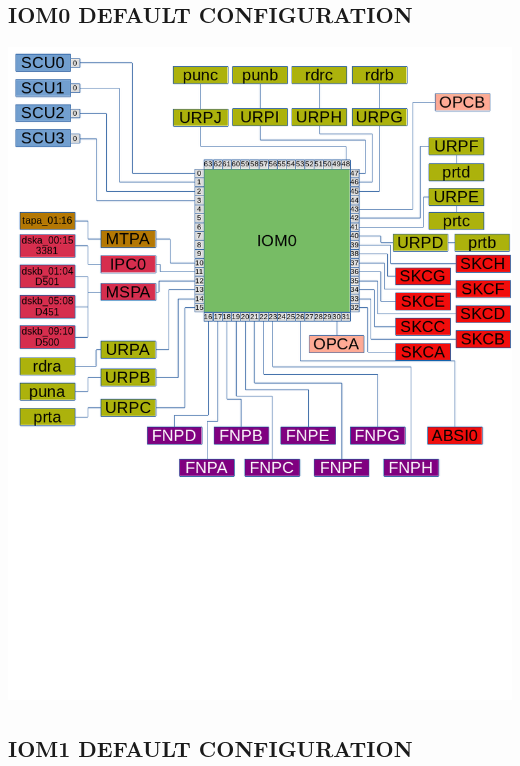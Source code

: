 \subsection[IOM0 Default Configuration]{IOM0 DEFAULT CONFIGURATION}

\noindent\includegraphics[width=\textwidth,height=\textheight,keepaspectratio]{DefaultCablingDiagram-IOM0.png}

\subsection[IOM1 Default Configuration]{IOM1 DEFAULT CONFIGURATION}

